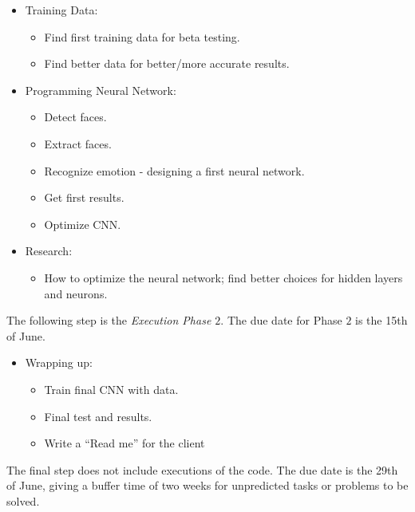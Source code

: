 \documentclass[]{article}
\begin{document}
\begin{itemize}
\item Training Data:
	\begin{itemize}
	\item Find first training data for beta testing.
	\item Find better data for better/more accurate results.
	\end{itemize}

\item Programming Neural Network:
	\begin{itemize}
	\item Detect faces.
	\item Extract faces.
	\item Recognize emotion - designing a first neural network.
	\item Get first results.
	\item Optimize CNN.
	\end{itemize}
	
\item Research:
	\begin{itemize}
	\item How to optimize the neural network; find better choices for hidden layers and neurons. 
	\end{itemize}
\end{itemize}

The following step is the \textit{Execution Phase $2$}. The due date for Phase $2$ is the 15th of June.

\begin{itemize}

\item Wrapping up:
	\begin{itemize}
	\item Train final CNN with data.
	\item Final test and results.
	\item Write a ``Read me'' for the client
	\end{itemize}

\end{itemize}

The final step does not include executions of the code. The due date is the 29th of June, giving a buffer time of two weeks for unpredicted tasks or problems to be solved.
\end{document}
